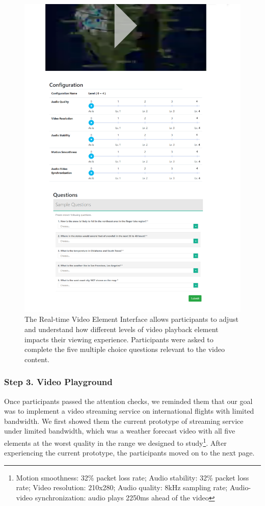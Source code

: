\begin{figure}[htpb]
    \centering
    \includegraphics[width=\textwidth, keepaspectratio=true]{content/image/exp2_playground.png}
    \caption{
        The Real-time Video Element Interface allows participants to adjust and understand how different levels of video playback element impacts their viewing experience. Participants were asked to complete the five multiple choice questions relevant to the video content.
    }
    \label{fig:exp2_playground}
\end{figure}


\subsubsection{Step 3. Video Playground}
Once participants passed the attention checks, we reminded them that our goal was to implement a video streaming service on international flights with limited bandwidth. We first showed them the current prototype of streaming service under limited bandwidth, which was a weather forecast video with all five elements at the worst quality in the range we designed to study\footnote{Motion smoothness: 32\% packet loss rate; Audio stability: 32\% packet loss rate; Video resolution: 210x280; Audio quality: 8kHz sampling rate; Audio-video synchronization: audio plays 2250ms ahead of the video}. After experiencing the current prototype, the participants moved on to the next page.

